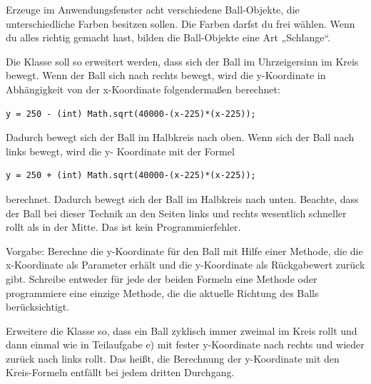 \begin{compactenum}[a)]
Erzeuge im Anwendungsfenster acht verschiedene Ball-Objekte, die
unterschiedliche Farben besitzen sollen. Die Farben darfst du frei wählen. Wenn
du alles richtig gemacht hast, bilden die Ball-Objekte eine Art „Schlange“.

\item Die Klasse  soll so erweitert werden, dass sich der Ball im
Uhrzeigersinn im Kreis bewegt. Wenn der Ball sich nach rechts bewegt, wird die
y-Koordinate in Abhängigkeit von der x-Koordinate folgendermaßen berechnet:

\begin{lstlisting}
y = 250 - (int) Math.sqrt(40000-(x-225)*(x-225));
\end{lstlisting}

Dadurch bewegt sich der Ball im Halbkreis nach oben. Wenn sich der Ball nach
links bewegt, wird die y- Koordinate mit der Formel

\begin{lstlisting}
y = 250 + (int) Math.sqrt(40000-(x-225)*(x-225));
\end{lstlisting}

berechnet. Dadurch bewegt sich der Ball im Halbkreis nach unten. Beachte, dass
der Ball bei dieser Technik an den Seiten links und rechts wesentlich schneller
rollt als in der Mitte. Das ist kein Programmierfehler.

Vorgabe: Berechne die y-Koordinate für den Ball mit Hilfe einer Methode, die
die x-Koordinate als Parameter erhält und die y-Koordinate als Rückgabewert
zurück gibt. Schreibe entweder für jede der beiden Formeln eine Methode oder
programmiere eine einzige Methode, die die aktuelle Richtung des Balls
berücksichtigt.

\item Erweitere die Klasse  so, dass ein Ball zyklisch immer
zweimal im Kreis rollt und dann einmal wie in Teilaufgabe e) mit fester
y-Koordinate nach rechts und wieder zurück nach links rollt. Das heißt, die
Berechnung der y-Koordinate mit den Kreis-Formeln entfällt bei jedem dritten
Durchgang.

\end{compactenum}